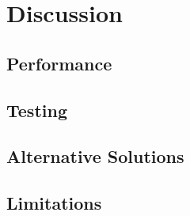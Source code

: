 
\chapter{Discussion}
\label{ch:discussion}

\section{Performance}
\label{sec:discussion:performance}

\kant[30-32]

\section{Testing}
\label{sec:discussion:testing}

\kant[33-35]

\section{Alternative Solutions}
\label{sec:discussion:alternative+solutions}

\kant[36-38]

\section{Limitations}
\label{sec:discussion:limitations}

\kant[39-41]


